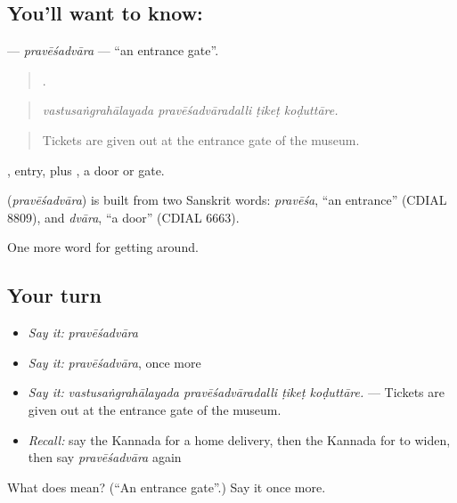 \subsection*{You'll want to know: }
\textbf{} — \emph{pravēśadvāra} — \textquotedblleft{}an entrance gate\textquotedblright{}.

\begin{quote}
   .
\end{quote}

\begin{quote}
\emph{vastusaṅgrahālayada pravēśadvāradalli ṭikeṭ koḍuttāre.}
\end{quote}

\begin{quote}
Tickets are given out at the entrance gate of the museum.
\end{quote}

, entry, plus , a door or gate.

\begin{cousinweb}
\textbf{} (\emph{pravēśadvāra}) is built from two Sanskrit words: \emph{pravēśa}, \textquotedblleft{}an entrance\textquotedblright{} (CDIAL 8809), and \emph{dvāra}, \textquotedblleft{}a door\textquotedblright{} (CDIAL 6663).
\end{cousinweb}

\begin{grammarlens}[title={What you've built}]
One more word for getting around.
\end{grammarlens}

\subsection*{Your turn}
\begin{itemize}
\raggedright
  \item \emph{Say it:} \emph{pravēśadvāra}
  \item \emph{Say it:} \emph{pravēśadvāra}, once more
  \item \emph{Say it:} \emph{vastusaṅgrahālayada pravēśadvāradalli ṭikeṭ koḍuttāre.} — Tickets are given out at the entrance gate of the museum.
  \item \emph{Recall:} say the Kannada for a home delivery, then the Kannada for to widen, then say \emph{pravēśadvāra} again
\end{itemize}

\begin{tcolorbox}[breakable,colback=teal!4,colframe=teal!35!black,title={Before you move on}]
What does  mean? (\textquotedblleft{}An entrance gate\textquotedblright{}.) Say it once more.
\end{tcolorbox}
